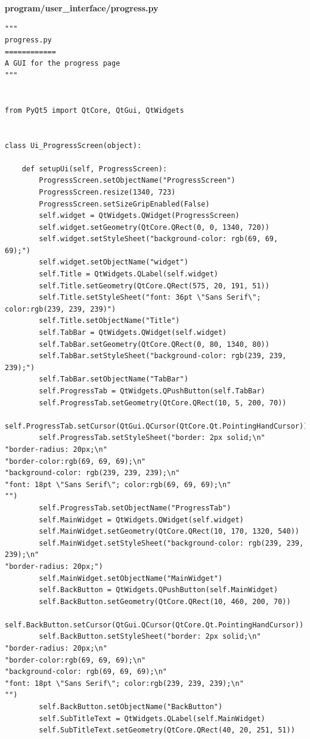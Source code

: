 \documentclass[12pt]{article}
\begin{document}
\textbf{program/user\_interface/progress.py}
\begin{lstlisting}
"""
progress.py
============
A GUI for the progress page
"""


from PyQt5 import QtCore, QtGui, QtWidgets


class Ui_ProgressScreen(object):

    def setupUi(self, ProgressScreen):
        ProgressScreen.setObjectName("ProgressScreen")
        ProgressScreen.resize(1340, 723)
        ProgressScreen.setSizeGripEnabled(False)
        self.widget = QtWidgets.QWidget(ProgressScreen)
        self.widget.setGeometry(QtCore.QRect(0, 0, 1340, 720))
        self.widget.setStyleSheet("background-color: rgb(69, 69, 69);")
        self.widget.setObjectName("widget")
        self.Title = QtWidgets.QLabel(self.widget)
        self.Title.setGeometry(QtCore.QRect(575, 20, 191, 51))
        self.Title.setStyleSheet("font: 36pt \"Sans Serif\"; color:rgb(239, 239, 239)")
        self.Title.setObjectName("Title")
        self.TabBar = QtWidgets.QWidget(self.widget)
        self.TabBar.setGeometry(QtCore.QRect(0, 80, 1340, 80))
        self.TabBar.setStyleSheet("background-color: rgb(239, 239, 239);")
        self.TabBar.setObjectName("TabBar")
        self.ProgressTab = QtWidgets.QPushButton(self.TabBar)
        self.ProgressTab.setGeometry(QtCore.QRect(10, 5, 200, 70))
        self.ProgressTab.setCursor(QtGui.QCursor(QtCore.Qt.PointingHandCursor))
        self.ProgressTab.setStyleSheet("border: 2px solid;\n"
"border-radius: 20px;\n"
"border-color:rgb(69, 69, 69);\n"
"background-color: rgb(239, 239, 239);\n"
"font: 18pt \"Sans Serif\"; color:rgb(69, 69, 69);\n"
"")
        self.ProgressTab.setObjectName("ProgressTab")
        self.MainWidget = QtWidgets.QWidget(self.widget)
        self.MainWidget.setGeometry(QtCore.QRect(10, 170, 1320, 540))
        self.MainWidget.setStyleSheet("background-color: rgb(239, 239, 239);\n"
"border-radius: 20px;")
        self.MainWidget.setObjectName("MainWidget")
        self.BackButton = QtWidgets.QPushButton(self.MainWidget)
        self.BackButton.setGeometry(QtCore.QRect(10, 460, 200, 70))
        self.BackButton.setCursor(QtGui.QCursor(QtCore.Qt.PointingHandCursor))
        self.BackButton.setStyleSheet("border: 2px solid;\n"
"border-radius: 20px;\n"
"border-color:rgb(69, 69, 69);\n"
"background-color: rgb(69, 69, 69);\n"
"font: 18pt \"Sans Serif\"; color:rgb(239, 239, 239);\n"
"")
        self.BackButton.setObjectName("BackButton")
        self.SubTitleText = QtWidgets.QLabel(self.MainWidget)
        self.SubTitleText.setGeometry(QtCore.QRect(40, 20, 251, 51))

\end{lstlisting}
\end{document}
